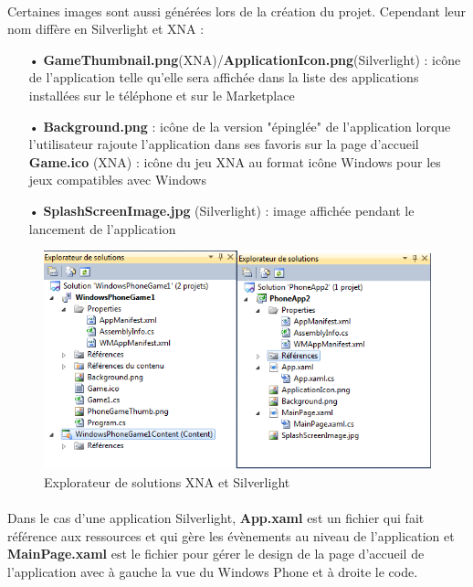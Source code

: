 \documentclass[twoside,UTF8]{EPURapport}
\begin{document}
\paragraph{}
Certaines images sont aussi générées lors de la création du projet. Cependant leur nom diffère en Silverlight et XNA : 
\begin{itemize}
	\item[•]\textbf{GameThumbnail.png}(XNA)/\textbf{ApplicationIcon.png}(Silverlight) : icône de l'application telle qu'elle sera affichée dans la liste des applications installées sur le téléphone et sur le Marketplace
	\item[•]\textbf{Background.png} : icône de la version "épinglée" de l'application lorque l'utilisateur rajoute l'application dans ses favoris sur la page d'accueil
	\textbf{Game.ico} (XNA) : icône du jeu XNA au format icône Windows pour les jeux compatibles avec Windows
	\item[•]\textbf{SplashScreenImage.jpg} (Silverlight) : image affichée pendant le lancement de l'application 
\end{itemize}

	\begin{figure}[H]	
		\center
		\includegraphics[scale=0.8]{images/explorateursolution.png}		
		\caption{Explorateur de solutions XNA et Silverlight}
	\end{figure}

\paragraph{}
Dans le cas d'une application Silverlight, \textbf{App.xaml} est un fichier qui fait référence aux ressources et qui gère les évènements au niveau de l'application et \textbf{MainPage.xaml}  est le fichier pour gérer le design de la page d'accueil de l'application  avec à gauche la vue du Windows Phone et à droite le code.
\end{document}
